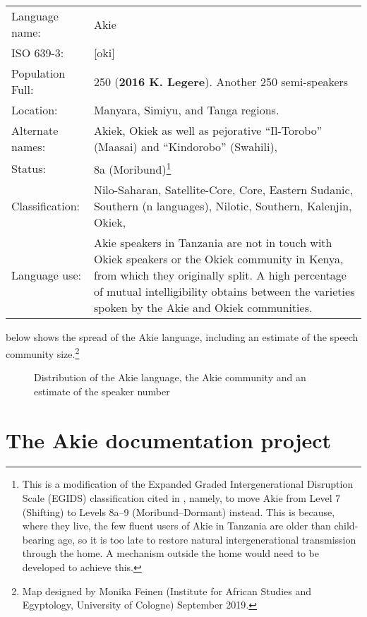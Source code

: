 \documentclass[output=paper,colorlinks,citecolor=brown]{langscibook}
\begin{document}
\begin{tabular}{p{3cm} p{8cm}}
Language name: & Akie \\
ISO 639-3: &  	 [oki] \\
Population Full:	&  250 (\textbf{2016 K. Legere}). Another 250 semi-speakers \\
Location:	& 	Manyara, Simiyu, and Tanga regions. \\
Alternate names: & Akiek, Okiek as well as pejorative “Il-Torobo” (Maasai) and “Kindorobo” (Swahili), \\
Status: & 	8a (Moribund)\footnote{This is a modification of the Expanded Graded Intergenerational Disruption Scale (EGIDS) classification cited in \citet[7]{SimonsFennig2018}, namely, to move Akie from Level 7 (Shifting) to Levels 8a–9 (Moribund–Dormant) instead. This is because, where they live, the few fluent users of Akie in Tanzania are older than child-bearing age, so it is too late to restore natural intergenerational transmission through the home. A mechanism outside the home would need to be developed to achieve this.} \\
Classification:	 & Nilo-Saharan, Satellite-Core, Core, Eastern Sudanic, Southern (n languages), Nilotic, Southern, Kalenjin, Okiek, \\
Language use: & 	Akie speakers in Tanzania are not in touch with Okiek speakers or the Okiek community in Kenya, from which they originally split. A high percentage of mutual intelligibility obtains between the varieties spoken by the Akie and Okiek communities. \\
\end{tabular}

 below shows the spread of the Akie language, including an estimate of the speech community size.\footnote{Map designed by Monika Feinen (Institute for African Studies and Egyptology, University of Cologne) September 2019.}


\begin{figure}[!ht]
    \caption{Distribution of the Akie language, the Akie community and an estimate of the speaker number}
    \label{fig:legere:1}
\end{figure}

\section{The Akie documentation project}\label{sec:legere:2}
\end{document}
